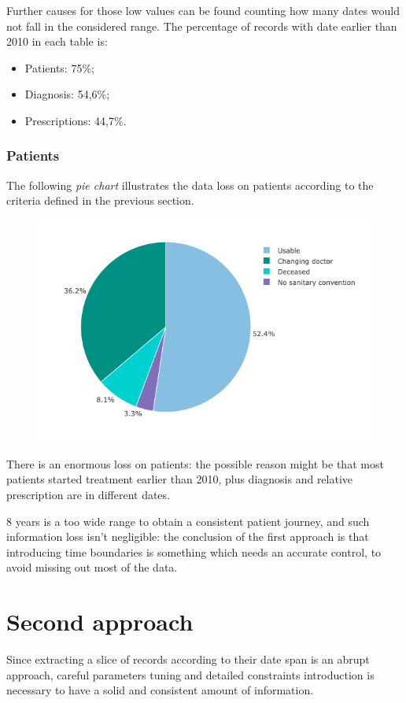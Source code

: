 Further causes for those low values can be found counting how many dates would not fall in the considered range. The percentage of records with date earlier than 2010 in each table is:
\begin{itemize}
	\item Patients: 75\%;
	\item Diagnosis: 54,6\%;
	\item Prescriptions: 44,7\%.
\end{itemize}

\subsubsection{Patients}
The following \textit{pie chart} illustrates the data loss on patients according to the criteria defined in the previous section.
\begin{figure}[h]
	\centering
	\includegraphics[scale=0.6]{images/patients-pie-1.png}
\end{figure}

There is an enormous loss on patients: the possible reason might be that most patients started treatment earlier than 2010, plus diagnosis and relative prescription are in different dates.

8 years is a too wide range to obtain a consistent patient journey, and such information loss isn't negligible: the conclusion of the first approach is that introducing time boundaries is something which needs an accurate control, to avoid missing out most of the data.

\section{Second approach}
Since extracting a slice of records according to their date span is an abrupt approach, careful parameters tuning and detailed constraints introduction is necessary to have a solid and consistent amount of information.

